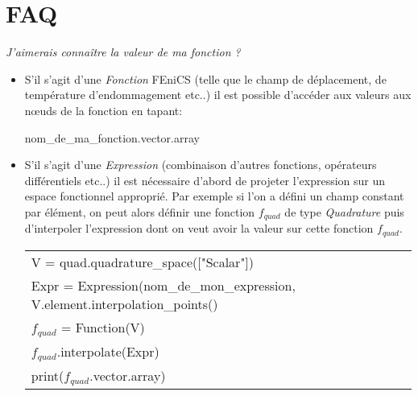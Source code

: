 \documentclass[10pt]{book}
\begin{document}
\section{FAQ}
\begin{center}
\emph{J'aimerais connaître la valeur de ma fonction ?}
\end{center}
\begin{itemize}
\item S'il s'agit d'une \emph{Fonction} FEniCS (telle que le champ de déplacement, de température d'endommagement etc..) il est possible d'accéder aux valeurs aux nœuds de la fonction en tapant: 
\begin{center}
nom\_de\_ma\_fonction.vector.array
\end{center}
\item S'il s'agit d'une \emph{Expression} (combinaison d'autres fonctions, opérateurs différentiels etc..) il est nécessaire d'abord de projeter l'expression sur un espace fonctionnel approprié. Par exemple si l'on a défini un champ constant par élément, on peut alors définir une fonction $f_{quad}$ de type \emph{Quadrature} puis d'interpoler l'expression dont on veut avoir la valeur sur cette fonction $f_{quad}$.
\begin{center}
\begin{tabular}{l}
V = quad.quadrature\_space(["Scalar"])\\
Expr = Expression(nom\_de\_mon\_expression, V.element.interpolation\_points()\\
$f_{quad}$  = Function(V)\\
$f_{quad}$.interpolate(Expr)\\
print($f_{quad}$.vector.array)
\end{tabular}
\end{center}
\end{itemize}
\end{document}
